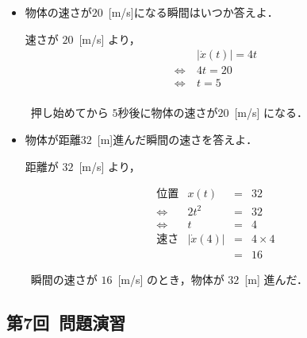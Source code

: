 \documentclass[a4paper,11pt]{ltjsarticle}
\begin{document}
\begin{enumerate}
\begin{itemize}
    \item 物体の速さが$20$\ [m/s]になる瞬間はいつか答えよ．
    
    速さが $20$\ [m/s] より，
    \begin{equation}
      \renewcommand{\arraystretch}{2}
      \begin{array}{rl}
        &\ |\dot{x}(t)| = 4t
        \\
        \Leftrightarrow
        &\ 4t = 20
        \\
        \Leftrightarrow
        &\ t = 5
        \\
      \end{array}
    \end{equation}

\begin{center}
  \therefore\ 押し始めてから $5$秒後に物体の速さが$20$\ [m/s] になる．
\end{center}
    
\clearpage

    \item 物体が距離$32$\ [m]進んだ瞬間の速さを答えよ．

    距離が $32$\ [m/s] より，

    \begin{equation}
      \renewcommand{\arraystretch}{2}
      \begin{array}{rccl}
        位置
        &
        x(t)
        &=&
        32
        \\
        \Leftrightarrow
        &
        2t^{2}
        &=&
        32
        \\
        \Leftrightarrow
        &
        t
        &=&
        4
        \\
        速さ
        &
        |\dot{x}(4)|
        &=&
        4 \times 4
        \\
        &
        &=&
        16
      \end{array}
    \end{equation}

\begin{center}
  \therefore\ 瞬間の速さが $16$\ [m/s] のとき，物体が $32$\ [m] 進んだ．
\end{center}

  \end{itemize}
\end{enumerate}

\subsection{第7回\ 問題演習}
\end{document}
